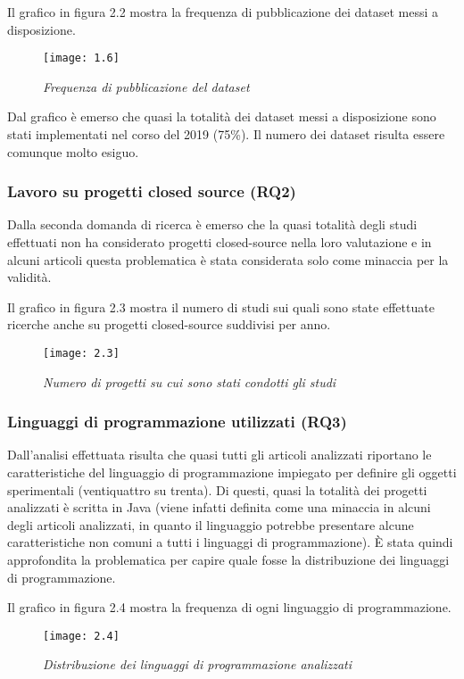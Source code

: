 Il grafico in figura 2.2 mostra la frequenza di pubblicazione dei dataset messi a disposizione.
\begin{figure}[h]
	\centering
	\texttt{[image: 1.6]}
	\caption{\emph{Frequenza di pubblicazione del dataset}}
	\label{fig:mesh1}
\end{figure}

Dal grafico è emerso che quasi la totalità dei dataset messi a disposizione
sono stati implementati nel corso del 2019 (75\%). Il numero dei dataset risulta essere comunque molto esiguo.
\subsubsection{Lavoro su progetti closed source (RQ2)}
Dalla seconda domanda di ricerca è emerso che la quasi totalità degli studi effettuati non ha considerato progetti closed-source nella loro valutazione e in alcuni articoli questa problematica è stata considerata solo come minaccia per la validità.

Il grafico in figura 2.3 mostra il numero di studi sui quali sono state effettuate ricerche anche su progetti closed-source suddivisi per anno.
\begin{figure}[h]
	\centering
	\texttt{[image: 2.3]}
	\caption{\emph{Numero di progetti su cui sono stati condotti gli studi}}
	\label{fig:mesh1}
\end{figure}
\subsubsection{Linguaggi di programmazione utilizzati (RQ3)}
Dall'analisi effettuata risulta che quasi tutti gli articoli analizzati riportano le caratteristiche del linguaggio di programmazione impiegato per definire gli oggetti
sperimentali (ventiquattro su trenta). Di questi, quasi la totalità dei progetti
analizzati è scritta in Java (viene infatti definita come una minaccia in alcuni degli
articoli analizzati, in quanto il linguaggio potrebbe presentare alcune caratteristiche
non comuni a tutti i linguaggi di programmazione). È stata quindi approfondita la problematica per capire quale fosse la distribuzione dei linguaggi di programmazione.

Il grafico in figura 2.4 mostra la frequenza di ogni linguaggio di programmazione.
\begin{figure}[h]
	\centering
	\texttt{[image: 2.4]}
	\caption{\emph{Distribuzione dei linguaggi di programmazione analizzati}}
	\label{fig:mesh1}
\end{figure}

